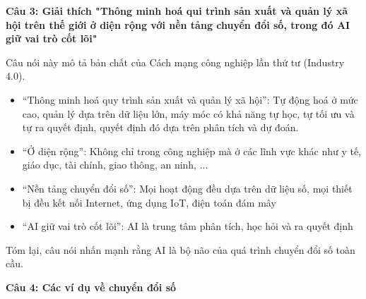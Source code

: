 \textbf{Câu 3: Giải thích "Thông minh hoá qui trình sản xuất và quản lý xã hội trên thế giới ở diện rộng với nền tảng chuyển đổi số, trong đó AI giữ vai trò cốt lõi"}

Câu nói này mô tả bản chất của Cách mạng công nghiệp lần thứ tư (Industry 4.0).

\begin{itemize}
	\item “Thông minh hoá quy trình sản xuất và quản lý xã hội”:
	Tự động hoá ở mức cao, quản lý dựa trên dữ liệu lớn, máy móc có khả năng tự học, tự tối ưu và tự ra quyết định, quyết định đó dựa trên phân tích và dự đoán.
	
	\item “Ở diện rộng”:
	Không chỉ trong công nghiệp mà ở các lĩnh vực khác như y tế, giáo dục, tài chính, giao thông, an ninh, ...
	
	\item “Nền tảng chuyển đổi số”:
	Mọi hoạt động đều dựa trên dữ liệu số, mọi thiết bị đều kết nối Internet, ứng dụng IoT, điện toán đám mây
	
	\item “AI giữ vai trò cốt lõi”:
	AI là trung tâm phân tích, học hỏi và ra quyết định
\end{itemize}

Tóm lại, câu nói nhấn mạnh rằng AI là bộ não của quá trình chuyển đổi số toàn cầu.

\textbf{Câu 4: Các ví dụ về chuyển đổi số}

